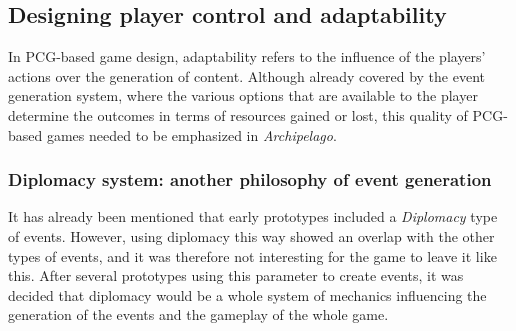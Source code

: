 \subsection{Designing player control and adaptability}
In PCG-based game design, adaptability refers to the influence of the players' actions over the generation of content. Although already covered by the event generation system, where the various options that are available to the player determine the outcomes in terms of resources gained or lost, this quality of PCG-based games needed to be emphasized in \textit{Archipelago}. 
\subsubsection{Diplomacy system: another philosophy of event generation}
It has already been mentioned that early prototypes included a \textit{Diplomacy} type of events. However, using diplomacy this way showed an overlap with the other types of events, and it was therefore not interesting for the game to leave it like this. After several prototypes using this parameter to create events, it was decided that diplomacy would be a whole system of mechanics influencing the generation of the events and the gameplay of the whole game. 


